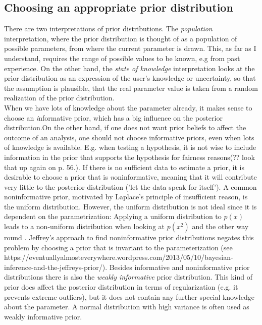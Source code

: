 \documentclass{article}
\begin{document}
\subsection{Choosing an appropriate prior distribution}
\label{Choosing an appropriate prior distribution}
There are two interpretations of prior distributions. The \textit{population} interpretation, where the prior distribution is thought of as a population of possible parameters, from where the current parameter is drawn. This, as far as I understand, requires the range of possible values to be known, e.g from past experience. On the other hand, the \textit{state of knowledge} interpretation looks at the prior distribution as an expression of the user's knowledge or uncertainty, so that the assumption is plausible, that the real parameter value is taken from a random realization of the prior distribution.
\\
When we have lots of knowledge about the parameter already, it makes sense to choose an \textit informative prior, which has a big influence on the posterior distribution.On the other hand, if one does not want prior beliefs to affect the outcome of an analysis, one should not choose informative priors, even when lots of knowledge is available. E.g. when testing a hypothesis, it is not wise to include information in the prior that supports the hypothesis for fairness reasons(?? look that up again on p. 56.). If there is no sufficient data to estimate a prior, it is desirable to choose a prior that is \textit noninformative, meaning that it will contribute very little to the posterior distribution ('let the data speak for itself'). A common noninformative prior, motivated by Laplace's principle of insufficient reason, is the uniform distribution. However, the uniform distribution is not ideal since it is dependent on the parametrization: Applying a uniform distribution to $p(x)$ leads to a non-uniform distribution when looking at $p(x^2)$ and the other way round \cite{1439840954}. Jeffrey's approach to find noninformative prior distributions negates this problem by choosing a prior that is invariant to the parameterization (see https://eventuallyalmosteverywhere.wordpress.com/2013/05/10/bayesian-inference-and-the-jeffreys-prior/).
Besides informative and noninformative prior distributions there is also the \textit {weakly informative} prior distribution. This kind of prior does affect the posterior distribution in terms of regularization (e.g. it prevents extreme outliers), but it does not contain any further special knowledge about the parameter. A normal distribution with high variance is often used as weakly informative prior.
\end{document}
